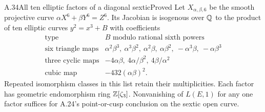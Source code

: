\begin{statement}{A.34}{All ten elliptic factors of a diagonal sextic}{Proved}
Let $X_{\alpha,\beta,6}$ be the smooth projective curve
$\alpha X^6+\beta Y^6=Z^6$. Its Jacobian is isogenous over $\mathbb Q$
to the product of ten elliptic curves $y^2=x^3+B$ with coefficients
\[
\begin{array}{c|l}
\text{type}&B\text{ modulo rational sixth powers}\\\hline
\text{six triangle maps}&
 \alpha^2\beta^3,\ \alpha^3\beta^2,\ \alpha^2\beta,\
 \alpha\beta^2,\ -\alpha^3\beta,\ -\alpha\beta^3\\
\text{three cyclic maps}&
 -4\alpha\beta,\ 4\alpha/\beta^2,\ 4\beta/\alpha^2\\
\text{cubic map}&-432(\alpha\beta)^2.
\end{array}
\tag{A34.1}
\]
Repeated isomorphism classes in this list retain their multiplicities.
Each factor has geometric endomorphism ring $\mathbb Z[\zeta_3]$.
Nonvanishing of $L(E,1)$ for any one factor suffices for A.24's
point-or-cusp conclusion on the sextic open curve.
\end{statement}
